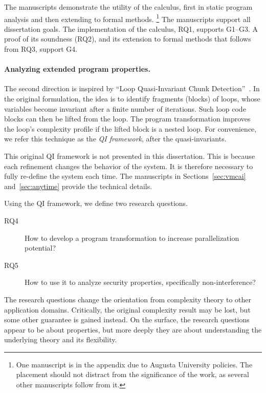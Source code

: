 The manuscripts demonstrate the utility of the calculus, first in static program
analysis and then extending to formal methods.%
\footnote{One manuscript is in the appendix due to Augusta University policies.
The placement should not distract from the significance of the work, as several
other manuscripts follow from it.} The manuscripts support all dissertation
goals. The implementation of the calculus, RQ1, supports G1--G3. A proof of its
soundness (RQ2), and its extension to formal methods that follows from RQ3,
support G4.

\paragraph*{Analyzing extended program properties.}

The second direction is inspired by \enquote{Loop Quasi-Invariant Chunk
Detection}~\cite{moyen20172}. In the original formulation, the idea is to
identify fragments (blocks) of loops, whose variables become invariant after a
finite number of iterations. Such loop  code blocks can
then be lifted from the loop. The program transformation improves the loop's
complexity profile if the lifted block is a nested loop. For convenience, we
refer this technique as the \emph{QI framework}, after the quasi-invariants.

This original QI framework is not presented in this dissertation. This is
because each refinement changes the behavior of the system. It is therefore
necessary to fully re-define the system each time. The manuscripts in
Sections~\ref{sec:vmcai} and~\ref{sec:anytime} provide the technical details.

Using the QI framework, we define two research questions.
\begin{description}
\item[RQ4] How to develop a program transformation to increase parallelization
potential?
\item[RQ5] How to use it to analyze security properties, specifically
non-interference?
\end{description}

The research questions change the orientation from complexity theory to other
application domains. Critically, the original complexity result may be lost, but
some other guarantee is gained instead. On the surface, the research questions
appear to be about properties, but more deeply they are about understanding the
underlying theory and its flexibility.

